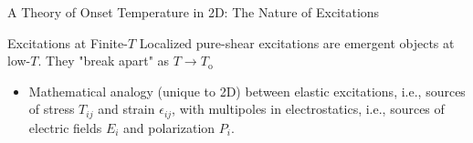 



    
    


\begin{frame}{A Theory of Onset Temperature in 2D: The Nature of Excitations}
\begin{block}{\centering \large Excitations at Finite-$T$}
Localized pure-shear excitations are emergent objects at low-$T$. They "break apart" as $T \to T_\mathrm{o}$ 
\end{block}


\vspace{-7pt}
\begin{itemize}
\item<2-> Mathematical analogy (unique to 2D) between elastic excitations, i.e., sources of stress $T_{ij}$ and strain $\epsilon_{ij}$, with multipoles in electrostatics, i.e., sources of electric fields $E_i$ and polarization $P_i$. 


\end{itemize}
\end{frame}
